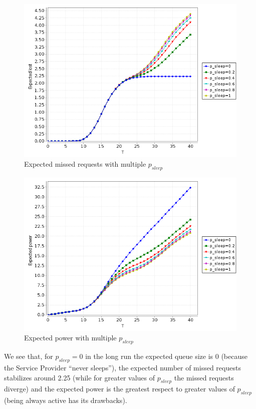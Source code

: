 \begin{figure}[htb]
  \centering
  \includegraphics[width=13cm]{quantitative-project/expected-missed-requests-with-psleep.png}
  \caption{Expected missed requests with multiple $p_{sleep}$}
  \label{fig:expected-missed-requests-with-psleep}
\end{figure}
\begin{figure}[htb]
  \centering
  \includegraphics[width=13cm]{quantitative-project/expected-power-with-psleep.png}
  \caption{Expected power with multiple $p_{sleep}$}
  \label{fig:expected-power-psleep}
\end{figure}
We see that, for $p_{sleep} = 0$ in the long run the expected queue
size is 0 (because the Service Provider ``never sleeps''), the
expected number of missed requests stabilizes around 2.25 (while for
greater values of $p_{sleep}$ the missed requests diverge) and the
expected power is the greatest respect to greater values of
$p_{sleep}$ (being always active has its drawbacks).

